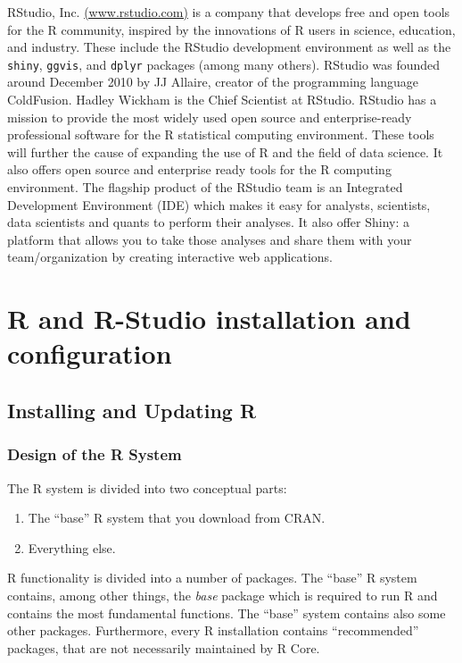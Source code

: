 \documentclass[]{book}
\providecommand{\tightlist}{%
  \setlength{\itemsep}{0pt}\setlength{\parskip}{0pt}}
\def\tightlist{}
\begin{document}
RStudio, Inc. \href{http://www.rstudio.com/}{(www.rstudio.com)} is a
company that develops free and open tools for the R community, inspired
by the innovations of R users in science, education, and industry. These
include the RStudio development environment as well as the
\texttt{shiny}, \texttt{ggvis}, and \texttt{dplyr} packages (among many
others). RStudio was founded around December 2010 by JJ Allaire, creator
of the programming language ColdFusion. Hadley Wickham is the Chief
Scientist at RStudio. RStudio has a mission to provide the most widely
used open source and enterprise-ready professional software for the R
statistical computing environment. These tools will further the cause of
expanding the use of R and the field of data science. It also offers
open source and enterprise ready tools for the R computing environment.
The flagship product of the RStudio team is an Integrated Development
Environment (IDE) which makes it easy for analysts, scientists, data
scientists and quants to perform their analyses. It also offer Shiny: a
platform that allows you to take those analyses and share them with your
team/organization by creating interactive web applications.

\chapter{R and R-Studio installation and
configuration}\label{r-and-r-studio-installation-and-configuration}

\section{Installing and Updating R}\label{installing-and-updating-r}

\subsection{Design of the R System}\label{design-of-the-r-system}

The R system is divided into two conceptual parts:

\begin{enumerate}
\def\labelenumi{\arabic{enumi}.}
\tightlist
\item
  The ``base'' R system that you download from CRAN.
\item
  Everything else.
\end{enumerate}

R functionality is divided into a number of packages. The ``base'' R
system contains, among other things, the \emph{base} package which is
required to run R and contains the most fundamental functions. The
``base'' system contains also some other packages. Furthermore, every R
installation contains ``recommended'' packages, that are not necessarily
maintained by R Core.
\end{document}

